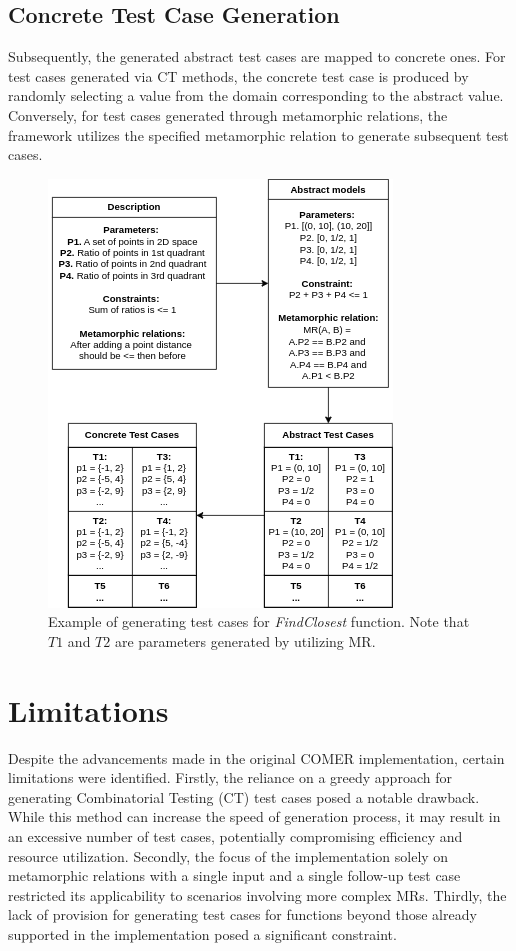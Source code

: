 \subsection{Concrete Test Case Generation}\label{subsec:concrete-test-case-generation}

Subsequently, the generated abstract test cases are mapped to concrete ones.
For test cases generated via CT methods, the concrete test case is produced by randomly selecting a value from the domain corresponding to the abstract value.
Conversely, for test cases generated through metamorphic relations, the framework utilizes the specified metamorphic relation to generate subsequent test cases.

\begin{figure}[hbt]
    \centering
    \includegraphics[]{figs/test_cases.png}
    \caption{Example of generating test cases for \textit{FindClosest} function. Note that $T1$ and $T2$ are parameters generated by utilizing MR.}
    \label{fig:secex}
\end{figure}


\section{Limitations}\label{sec:limitations}

Despite the advancements made in the original COMER implementation, certain limitations were identified.
Firstly, the reliance on a greedy approach for generating Combinatorial Testing (CT) test cases posed a notable drawback.
While this method can increase the speed of generation process, it may result in an excessive number of test cases, potentially compromising efficiency and resource utilization.
Secondly, the focus of the implementation solely on metamorphic relations with a single input and a single follow-up test case restricted its applicability to scenarios involving more complex MRs. Thirdly, the lack of provision for generating test cases for functions beyond those already supported in the implementation posed a significant constraint.

